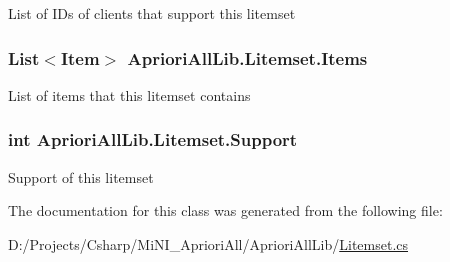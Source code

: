 List of I\-Ds of clients that support this litemset 

\hypertarget{class_apriori_all_lib_1_1_litemset_aef38d5fccb4e45867abf5838ab8a68fa}{
\subsubsection[{Items}]{\setlength{\rightskip}{0pt plus 5cm}List$<${\bf Item}$>$ Apriori\-All\-Lib.\-Litemset.\-Items}}\label{class_apriori_all_lib_1_1_litemset_aef38d5fccb4e45867abf5838ab8a68fa}


List of items that this litemset contains 

\hypertarget{class_apriori_all_lib_1_1_litemset_a9f37ba3b3423bc7a1619493132dbc3e2}{
\subsubsection[{Support}]{\setlength{\rightskip}{0pt plus 5cm}int Apriori\-All\-Lib.\-Litemset.\-Support}}\label{class_apriori_all_lib_1_1_litemset_a9f37ba3b3423bc7a1619493132dbc3e2}


Support of this litemset 



The documentation for this class was generated from the following file\-:\begin{DoxyCompactItemize}
\item 
D\-:/\-Projects/\-Csharp/\-Mi\-N\-I\-\_\-\-Apriori\-All/\-Apriori\-All\-Lib/\hyperlink{_litemset_8cs}{Litemset.\-cs}\end{DoxyCompactItemize}
